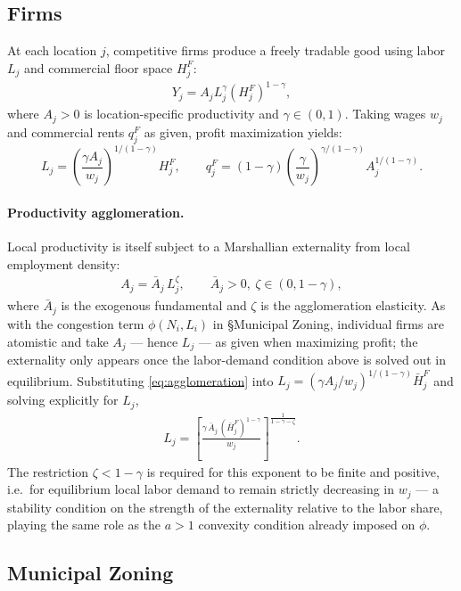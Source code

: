 \documentclass[12pt, a4paper]{article}
\theoremstyle{definition}
\theoremstyle{remark}
\begin{document}
\subsection{Firms}

At each location $j$, competitive firms produce a freely tradable good using labor $L_j$ and commercial floor space $H_j^F$:
\begin{align}
    \label{eq:firm-production}
Y_j = A_j L_j^{\gamma}(H_j^F)^{1-\gamma},
\end{align}
where $A_j > 0$ is location-specific productivity and $\gamma \in (0,1)$. Taking wages $w_j$ and commercial rents $q_j^F$ as given, profit maximization yields:
\[
L_{j}=(\frac{\gamma A_{j}}{w_{j}})^{1/(1-\gamma)}H_{j}^F, \qquad
q_{j}^F=(1-\gamma)(\frac{\gamma}{w_{j}})^{\gamma/(1-\gamma)}A_{j}^{1/(1-\gamma)}.
\]

\paragraph{Productivity agglomeration.} Local productivity is itself subject to a Marshallian externality from local employment density:
\begin{align}
    \label{eq:agglomeration}
    A_j = \bar A_j\,L_j^{\zeta}, \qquad \bar A_j>0,\ \zeta\in(0,1-\gamma),
\end{align}
where $\bar A_j$ is the exogenous fundamental and $\zeta$ is the agglomeration elasticity. As with the congestion term $\phi(N_i,L_i)$ in \S Municipal Zoning, individual firms are atomistic and take $A_j$ — hence $L_j$ — as given when maximizing profit; the externality only appears once the labor-demand condition above is solved out in equilibrium. Substituting \eqref{eq:agglomeration} into $L_j=(\gamma A_j/w_j)^{1/(1-\gamma)}\bar H_j^F$ and solving explicitly for $L_j$,
\begin{align}
    \label{eq:labor-demand-agglom}
    L_j = \left[\frac{\gamma\,\bar A_j\,(\bar H_j^F)^{1-\gamma}}{w_j}\right]^{\frac{1}{1-\gamma-\zeta}}.
\end{align}
The restriction $\zeta<1-\gamma$ is required for this exponent to be finite and positive, i.e.\ for equilibrium local labor demand to remain strictly decreasing in $w_j$ — a stability condition on the strength of the externality relative to the labor share, playing the same role as the $a>1$ convexity condition already imposed on $\phi$.

\subsection{Municipal Zoning}
\end{document}
